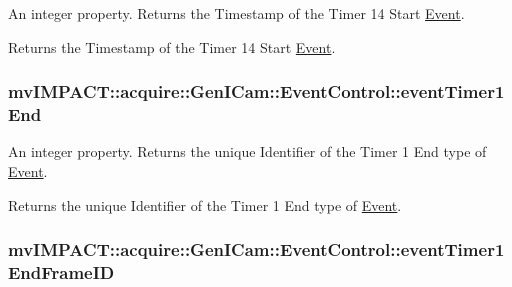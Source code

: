 An integer property. Returns the Timestamp of the Timer 14 Start \hyperlink{classmv_i_m_p_a_c_t_1_1acquire_1_1_event}{Event}. 

Returns the Timestamp of the Timer 14 Start \hyperlink{classmv_i_m_p_a_c_t_1_1acquire_1_1_event}{Event}. \hypertarget{classmv_i_m_p_a_c_t_1_1acquire_1_1_gen_i_cam_1_1_event_control_a4090f8e44f9f5be8b127c92cbeedf57d}{
\subsubsection[{event\+Timer1\+End}]{ mv\+I\+M\+P\+A\+C\+T\+::acquire\+::\+Gen\+I\+Cam\+::\+Event\+Control\+::event\+Timer1\+End}}\label{classmv_i_m_p_a_c_t_1_1acquire_1_1_gen_i_cam_1_1_event_control_a4090f8e44f9f5be8b127c92cbeedf57d}


An integer property. Returns the unique Identifier of the Timer 1 End type of \hyperlink{classmv_i_m_p_a_c_t_1_1acquire_1_1_event}{Event}. 

Returns the unique Identifier of the Timer 1 End type of \hyperlink{classmv_i_m_p_a_c_t_1_1acquire_1_1_event}{Event}. \hypertarget{classmv_i_m_p_a_c_t_1_1acquire_1_1_gen_i_cam_1_1_event_control_aa2a14fbba221a83de15b4aa3cb259e81}{
\subsubsection[{event\+Timer1\+End\+Frame\+I\+D}]{ mv\+I\+M\+P\+A\+C\+T\+::acquire\+::\+Gen\+I\+Cam\+::\+Event\+Control\+::event\+Timer1\+End\+Frame\+I\+D}}\label{classmv_i_m_p_a_c_t_1_1acquire_1_1_gen_i_cam_1_1_event_control_aa2a14fbba221a83de15b4aa3cb259e81}


